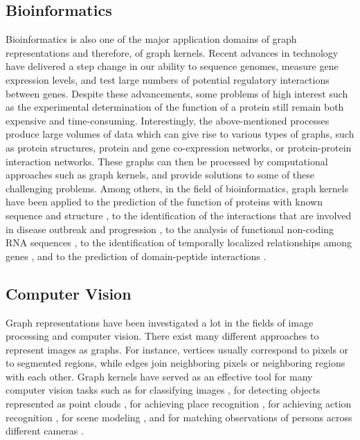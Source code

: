 \documentclass[twoside,11pt]{article}
\begin{document}
\subsection{Bioinformatics}
Bioinformatics is also one of the major application domains of graph representations and therefore, of graph kernels.
Recent advances in technology have delivered a step change in our ability to sequence genomes, measure gene expression levels, and test large numbers of potential regulatory interactions between genes.
Despite these advancements, some problems of high interest such as the experimental determination of the function of a protein still remain both expensive and time-consuming.
Interestingly, the above-mentioned processes produce large volumes of data which can give rise to various types of graphs, such as protein structures, protein and gene co-expression networks, or protein-protein interaction networks.
These graphs can then be processed by computational approaches such as graph kernels, and provide solutions to some of these challenging problems. 
Among others, in the field of bioinformatics, graph kernels have been applied to the prediction of the function of proteins with known sequence and structure \cite{borgwardt2005protein,schietgat2015predicting}, to the identification of the interactions that are involved in disease outbreak and progression \cite{borgwardt2007graphkernels}, to the analysis of functional non-coding RNA sequences \cite{sato2008directed}, to the identification of temporally localized relationships among genes \cite{antoniotti2010application}, and to the prediction of domain-peptide interactions \cite{kundu2013graph}.

\subsection{Computer Vision}
Graph representations have been investigated a lot in the fields of image processing and computer vision.
There exist many different approaches to represent images as graphs.
For instance, vertices usually correspond to pixels or to segmented regions, while edges join neighboring pixels or neighboring regions with each other.
Graph kernels have served as an effective tool for many computer vision tasks such as for classifying images \cite{harchaoui2007image,mahboubi2010object,antanas2012relational,zhang2013fast}, for detecting objects represented as point clouds \cite{bach2008graph,neumann2013graph}, for achieving place recognition \cite{stumm2016robust}, for achieving action recognition \cite{wang2013directed,wu2014human,li20163d}, for scene  modeling \cite{fisher2011characterizing}, and for matching observations of persons across different cameras \cite{brun2011people}.
\end{document}
